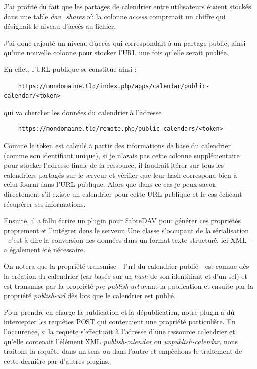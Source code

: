 \documentclass[10pt,a4paper, twoside]{report}
\begin{document}
	J'ai profité du fait que les partages de calendrier entre utilisateurs étaient stockés dans une table \textit{dav\_shares} où la colonne \textit{access} comprenait un chiffre qui désignait le niveau d'accès au fichier.
	
	J'ai donc rajouté un niveau d'accès qui correspondait à un partage public, ainsi qu'une nouvelle colonne pour stocker l'URL une fois qu'elle serait publiée. 
	
	En effet, l'URL publique se constitue ainsi : 
	\begin{verbatim}
	https://mondomaine.tld/index.php/apps/calendar/public-calendar/<token>
	\end{verbatim}
	qui va chercher les données du calendrier à l'adresse
	\begin{verbatim}
	https://mondomaine.tld/remote.php/public-calendars/<token>
	\end{verbatim}
	
	Comme le token est calculé à partir des informations de base du calendrier (comme son identifiant unique), si je n'avais pas cette colonne supplémentaire pour stocker l'adresse finale de la ressource, il faudrait itérer sur tous les calendriers partagés sur le serveur et vérifier que leur hash correspond bien à celui fourni dans l'URL publique. Alors que dans ce cas je peux savoir directement s'il existe un calendrier pour cette URL publique et le cas échéant récupérer ses informations.
	
	Ensuite, il a fallu écrire un plugin pour SabreDAV pour générer ces propriétés proprement et l'intégrer dans le serveur. Une classe s'occupant de la sérialisation - c'est à dire la conversion des données dans un format texte structuré, ici XML - a également été nécessaire.
	
	On notera que la propriété transmise - l'url du calendrier publié - est connue dès la création du calendrier (car basée sur un \textit{hash} de son identifiant et d'un sel) et est transmise par la propriété \textit{pre-publish-url} avant la publication et ensuite par la propriété \textit{publish-url} dès lors que le calendrier est publié.
	
	Pour prendre en charge la publication et la dépublication, notre plugin a dû intercepter les requêtes POST qui contenaient une propriété particulière.
	En l'occurence, si la requête s'effectuait à l'adresse d'une ressource calendrier et qu'elle contenait l'élément XML \textit{publish-calendar} ou \textit{unpublish-calendar}, nous traitons la requête dans un sens ou dans l'autre et empêchons le traitement de cette dernière par d'autres plugins.
	
\end{document}
